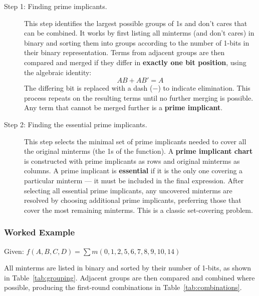 \begin{description}
    \item[Step 1: Finding prime implicants.]
    This step identifies the largest possible groups of 1s and don't cares
    that can be combined. It works by first listing all minterms (and don't
    cares) in binary and sorting them into groups according to the number of
    1-bits in their binary representation. Terms from adjacent groups are
    then compared and merged if they differ in \textbf{exactly one bit
    position}, using the algebraic identity:
    \[
        AB + AB' = A
    \]
    The differing bit is replaced with a dash ($-$) to indicate elimination.
    This process repeats on the resulting terms until no further merging is
    possible. Any term that cannot be merged further is a
    \textbf{prime implicant}.

    \item[Step 2: Finding the essential prime implicants.]
    This step selects the minimal set of prime implicants needed to cover
    all the original minterms (the 1s of the function). A
    \textbf{prime implicant chart} is constructed with prime implicants as
    rows and original minterms as columns. A prime implicant is
    \textbf{essential} if it is the only one covering a particular minterm
    — it must be included in the final expression. After selecting all
    essential prime implicants, any uncovered minterms are resolved by
    choosing additional prime implicants, preferring those that cover the
    most remaining minterms. This is a classic set-covering problem.
\end{description}

\subsubsection{Worked Example}

Given: \(f(A,B,C,D) = \sum m(0,1,2,5,6,7,8,9,10,14)\)

All minterms are listed in binary and sorted by their number of 1-bits,
as shown in Table~\ref{tab:grouping}. Adjacent groups are then compared and
combined where possible, producing the first-round combinations in
Table~\ref{tab:combinations}.

